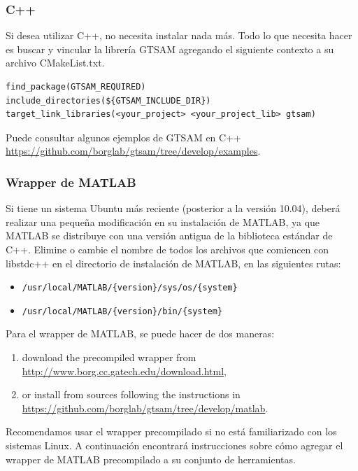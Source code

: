 \documentclass[tp]{lcc}
\begin{document}
\subsubsection*{C++}
Si desea utilizar C++, no necesita instalar nada más. Todo lo que necesita hacer es buscar y vincular la librería GTSAM agregando el siguiente contexto a su archivo CMakeList.txt.

\begin{lstlisting}[style=cmake]
find_package(GTSAM_REQUIRED)
include_directories(${GTSAM_INCLUDE_DIR})
target_link_libraries(<your_project> <your_project_lib> gtsam)
\end{lstlisting}

Puede consultar algunos ejemplos de GTSAM en C++ \url{https://github.com/borglab/gtsam/tree/develop/examples}.

\subsubsection*{Wrapper de MATLAB}
Si tiene un sistema Ubuntu más reciente (posterior a la versión 10.04), deberá realizar una pequeña modificación en su instalación de MATLAB, ya que MATLAB se distribuye con una versión antigua de la biblioteca estándar de C++. Elimine o cambie el nombre de todos los archivos que comiencen con libstdc++ en el directorio de instalación de MATLAB, en las siguientes rutas:

\begin{itemize}
    \item \lstinline[style=bash]|/usr/local/MATLAB/{version}/sys/os/{system}|
    \item \lstinline[style=bash]|/usr/local/MATLAB/{version}/bin/{system}|
\end{itemize}

Para el wrapper de MATLAB, se puede hacer de dos maneras:

\begin{enumerate}
    \item download the precompiled wrapper from \url{http://www.borg.cc.gatech.edu/download.html},
    \item or install from sources following the instructions in \url{https://github.com/borglab/gtsam/tree/develop/matlab}.
\end{enumerate}

Recomendamos usar el wrapper precompilado si no está familiarizado con los sistemas Linux. A continuación encontrará instrucciones sobre cómo agregar el wrapper de MATLAB precompilado a su conjunto de herramientas.
\end{document}
